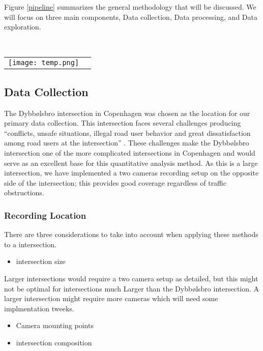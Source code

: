 
Figure \ref{pipeline} summarizes the general methodology that will be discussed. We will focus
on three main components, Data collection, Data processing, and Data exploration.

\ \\ 
\noindent
\begin{tabular}{@{}cc}
\texttt{[image: temp.png]} 
\end{tabular}
\label{pipeline}

\subsection{Data Collection}

The Dybbølsbro intersection in Copenhagen was chosen as the location for our primary data collection. 
This intersection faces several challenges producing “conflicts, unsafe situations, illegal road user behavior and great dissatisfaction among road users at the intersection” \cite{CPHpost_2021}.
These challenges make the Dybbølsbro intersection one of the more complicated intersections in Copenhagen and would serve as an excellent base for this quantitative analysis method. 
As this is a large intersection, we have implemented a two cameras recording setup on the opposite side of the intersection; this provides good coverage regardless of traffic obstructions.
\subsubsection{Recording Location}

There are three considerations to take into account when applying these methods to a intersection.
\begin{itemize}
	\item intersection size
\end{itemize}
Larger intersections would require a two camera setup as detailed, but this might not be optimal for intersections much Larger
than the Dybbølsbro intersection. A larger intersection might require more cameras which will need some implmentation tweeks.
\begin{itemize}
	\item Camera mounting points
\end{itemize}
\begin{itemize}
	\item intersection composition
\end{itemize}

